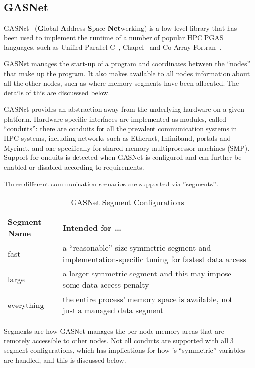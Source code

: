 \subsection{GASNet}

GASNet~\cite{gasnet} (\textbf{G}lobal-\textbf{A}ddress \textbf{S}pace
\textbf{Net}working) is a low-level library that has been used to
implement the runtime of a number of popular HPC PGAS languages, such
as Unified Parallel C~\cite{upc}, Chapel~\cite{chapel} and Co-Array
Fortran~\cite{coarray}.

GASNet manages the start-up of a program and coordinates between the
``nodes'' that make up the program.  It also makes available to all
nodes information about all the other nodes, such as where memory
segments have been allocated.  The details of this are discusssed
below.

GASNet provides an abstraction away from the underlying hardware on a
given platform.  Hardware-specific interfaces are implemented as
modules, called ``conduits'': there are conduits for all the prevalent
communication systems in HPC systems, including networks such as
Ethernet, Infiniband, portals and Myrinet, and one specifically for
shared-memory multiprocessor machines (SMP).  Support for onduits is
detected when GASNet is configured and can further be enabled or
disabled according to requirements.

Three different communication scenarios are supported via ''segments'':

\begin{table}[h]
  \begin{center}
    \caption{GASNet Segment Configurations}
    \begin{tabular}{|p{}|p{}|}
      \hline 
      Segment Name & Intended for \ldots \tabularnewline
      \hline
      \hline 
      fast & a ``reasonable'' size symmetric segment and
      implementation-specific tuning for fastest data access \tabularnewline
      \hline 
      large & a larger symmetric segment and this may impose some data access penalty \tabularnewline
      \hline 
      everything & the entire process' memory space is available, not just a managed data segment \tabularnewline
      \hline 
    \end{tabular}
  \end{center}
\end{table}

Segments are how GASNet manages the per-node memory areas that are
remotely accessible to other nodes.  Not all conduits are supported
with all 3 segment configurations, which has implications for how
\openshmem's ``symmetric'' variables are handled, and this is discussed
below.

